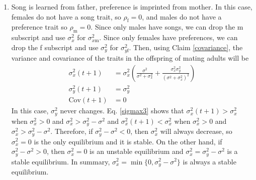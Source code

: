 \documentclass{article}
\newcommand{\x}[1]{\text{#1}}
\newcommand{\Cov}{\text{Cov}}
\begin{document}
\begin{enumerate}
\item Song is learned from father, preference is imprinted from mother. In this case, females do not have a song trait, so $\rho_\x{f}=0$, and males do not have a preference trait so $\rho_\x{m}=0$. Since only males have songs, we can drop the m subscript and use  $\sigma_x^2$ for $\sigma_{x\x{m}}^2$. Since only females have preferences, we can drop the f subscript and use $\sigma_y^2$ for $\sigma_{y\x{f}}^2$. Then, using Claim \ref{covariance}, the variance and covariance of the traits in the offspring of mating adults will be 
\begin{align}
\sigma_x^2(t+1)&=\sigma_x^2\left(\frac{\sigma^2}{\sigma^2+\sigma_x^2}+\frac{\sigma_x^2\sigma_y^2}{(\sigma^2+\sigma_x^2)^2}\right) \label{sigmax3}
\\ \sigma_y^2(t+1)&=\sigma_y^2 \label{sigmay3}
\\ \Cov(t+1)&=0
\end{align}
In this case, $\sigma_y^2$ never changes. Eq. \ref{sigmax3} shows that $\sigma_x^2(t+1)>\sigma_x^2$ when $\sigma_x^2>0$ and $\sigma_x^2>\sigma_y^2-\sigma^2$ and $\sigma_x^2(t+1)<\sigma_x^2$ when $\sigma_x^2>0$ and $\sigma_x^2>\sigma_y^2-\sigma^2$. Therefore, if $\sigma_y^2-\sigma^2<0$, then $\sigma_x^2$ will always decrease, so $\sigma_x^2=0$ is the only equilibrium and it is stable. On the other hand, if $\sigma_y^2-\sigma^2>0$, then $\sigma_x^2=0$ is an unstable equilibrium and $\sigma_x^2=\sigma_y^2-\sigma^2$ is a stable equilibrium. In summary, $\sigma_x^2=\min\{0,\sigma_y^2-\sigma^2\}$ is always a stable equilibrium.
 

\end{enumerate}
\end{document}
